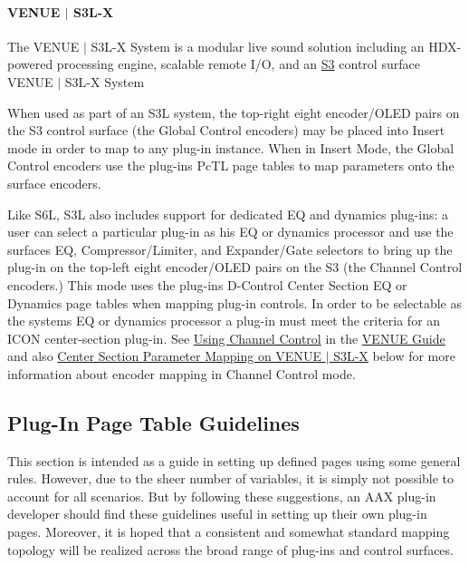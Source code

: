 \hypertarget{a00363_subsubsection__venue_s3l}{}\paragraph{V\+E\+N\+U\+E $\vert$ S3\+L-\/\+X}\label{a00363_subsubsection__venue_s3l}
The V\+E\+N\+U\+E $\vert$ S3\+L-\/\+X System is a modular live sound solution including an H\+D\+X-\/powered processing engine, scalable remote I/\+O, and an \hyperlink{a00363_subsubsection__avid_s3}{S3} control surface   V\+E\+N\+U\+E $\vert$ S3\+L-\/\+X System 

When used as part of an S3\+L system, the top-\/right eight encoder/\+O\+L\+E\+D pairs on the S3 control surface (the Global Control encoders) may be placed into Insert mode in order to map to any plug-\/in instance. When in Insert Mode, the Global Control encoders use the plug-\/in\textquotesingle{}s {\ttfamily \textquotesingle{}Pc\+T\+L\textquotesingle{}} page tables to map parameters onto the surface encoders.

Like S6\+L, S3\+L also includes support for dedicated E\+Q and dynamics plug-\/ins\+: a user can select a particular plug-\/in as his E\+Q or dynamics processor and use the surface\textquotesingle{}s E\+Q, Compressor/\+Limiter, and Expander/\+Gate selectors to bring up the plug-\/in on the top-\/left eight encoder/\+O\+L\+E\+D pairs on the S3 (the Channel Control encoders.) This mode uses the plug-\/in\textquotesingle{}s D-\/\+Control Center Section E\+Q or Dynamics page tables when mapping plug-\/in controls. In order to be selectable as the system\textquotesingle{}s E\+Q or dynamics processor a plug-\/in must meet the criteria for an I\+C\+O\+N center-\/section plug-\/in. See \hyperlink{a00377_aax_venue_guide__systems__s3l__using_channel_control}{Using Channel Control} in the \hyperlink{a00377}{V\+E\+N\+U\+E Guide} and also \hyperlink{a00363_aax_page_table_guide_04_avid_center_section_page_tables_venue_s3l_mapping}{Center Section Parameter Mapping on V\+E\+N\+U\+E $\vert$ S3\+L-\/\+X} below for more information about encoder mapping in Channel Control mode.



 \hypertarget{a00363_aax_page_table_guide_03_plug_in_page_table_guidelines}{}\subsection{Plug-\/\+In Page Table Guidelines}\label{a00363_aax_page_table_guide_03_plug_in_page_table_guidelines}
This section is intended as a guide in setting up defined \textquotesingle{}pages\textquotesingle{} using some general rules. However, due to the sheer number of variables, it is simply not possible to account for all scenarios. But by following these suggestions, an A\+A\+X plug-\/in developer should find these guidelines useful in setting up their own plug-\/in pages. Moreover, it is hoped that a consistent and somewhat standard mapping topology will be realized across the broad range of plug-\/ins and control surfaces.

